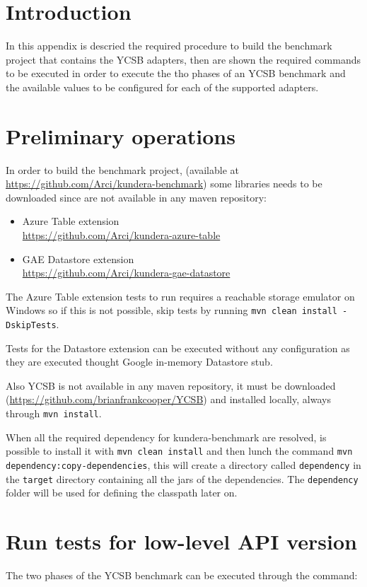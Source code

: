 \section{Introduction}
In this appendix is descried the required procedure to build the benchmark project that contains the YCSB adapters, then are shown the required commands to be executed in order to execute the tho phases of an YCSB benchmark and the available values to be configured for each of the supported adapters.

\section{Preliminary operations}
In order to build the benchmark project, (available at \url{https://github.com/Arci/kundera-benchmark}) some libraries needs to be downloaded since are not available in any maven repository:
\begin{itemize}
\item Azure Table extension\\ \url{https://github.com/Arci/kundera-azure-table}
\item GAE Datastore extension \\\url{https://github.com/Arci/kundera-gae-datastore}
\end{itemize}

\noindent The Azure Table extension tests to run requires a reachable storage emulator on Windows so if this is not possible, skip tests by running \texttt{mvn clean install -DskipTests}.
 
\noindent Tests for the Datastore extension can be executed without any configuration as they are executed thought Google in-memory Datastore stub.

\noindent Also YCSB is not available in any maven repository, it must be downloaded (\url{https://github.com/brianfrankcooper/YCSB}) and installed locally, always through \texttt{mvn install}.

\newparagraph When all the required dependency for kundera-benchmark are resolved, is possible to install it with \texttt{mvn clean install} and then lunch the command \texttt{mvn dependency:copy-dependencies}, this will create a directory called \texttt{dependency} in the \texttt{target} directory containing all the jars of the dependencies. The \texttt{dependency} folder will be used for defining the classpath later on.

\section{Run tests for low-level API version}
\label{appendix:ycsb-low-level}
The two phases of the YCSB benchmark can be executed through the command:


